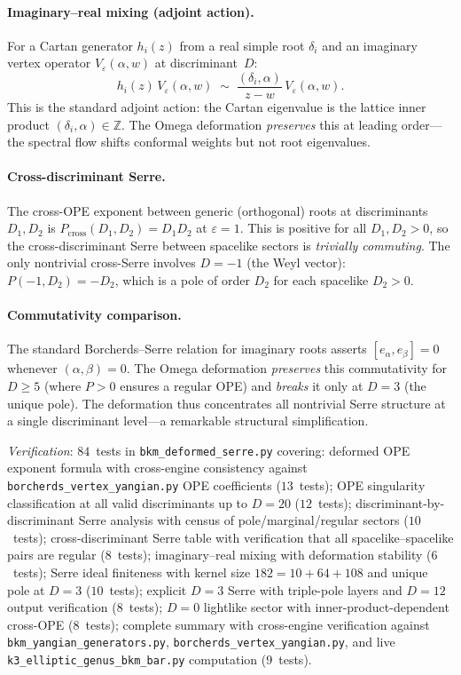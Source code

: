 \paragraph{Imaginary--real mixing (adjoint action).}
For a Cartan generator $h_i(z)$ from a real simple root $\delta_i$ and an imaginary
vertex operator $V_\varepsilon(\alpha, w)$ at discriminant~$D$:
\[
h_i(z)\, V_\varepsilon(\alpha, w)
\;\sim\; \frac{(\delta_i, \alpha)}{z - w}\, V_\varepsilon(\alpha, w).
\]
This is the standard adjoint action: the Cartan eigenvalue is the lattice inner product
$(\delta_i, \alpha) \in \mathbb{Z}$.  The Omega deformation \emph{preserves} this at
leading order---the spectral flow shifts conformal weights but not root eigenvalues.

\paragraph{Cross-discriminant Serre.}
The cross-OPE exponent between generic (orthogonal) roots at discriminants $D_1, D_2$
is $P_{\mathrm{cross}}(D_1, D_2) = D_1 D_2$ at $\varepsilon = 1$.  This is positive
for all $D_1, D_2 > 0$, so the cross-discriminant Serre between spacelike sectors is
\emph{trivially commuting}.  The only nontrivial cross-Serre involves $D = -1$
(the Weyl vector): $P(-1, D_2) = -D_2$, which is a pole of order $D_2$ for each
spacelike $D_2 > 0$.

\paragraph{Commutativity comparison.}
The standard Borcherds--Serre relation for imaginary roots asserts
$[e_\alpha, e_\beta] = 0$ whenever $(\alpha, \beta) = 0$.  The Omega deformation
\emph{preserves} this commutativity for $D \geq 5$ (where $P > 0$ ensures a regular
OPE) and \emph{breaks} it only at $D = 3$ (the unique pole).  The deformation thus
concentrates all nontrivial Serre structure at a single discriminant level---a
remarkable structural simplification.

\noindent\textit{Verification}: $84$~tests in \texttt{bkm\_deformed\_serre.py}
covering: deformed OPE exponent formula with cross-engine consistency against
\texttt{borcherds\_vertex\_yangian.py} OPE coefficients ($13$~tests); OPE singularity
classification at all valid discriminants up to $D = 20$ ($12$~tests); discriminant-by-discriminant
Serre analysis with census of pole/marginal/regular sectors ($10$~tests); cross-discriminant
Serre table with verification that all spacelike--spacelike pairs are regular ($8$~tests);
imaginary--real mixing with deformation stability ($6$~tests); Serre ideal finiteness
with kernel size $182 = 10 + 64 + 108$ and unique pole at $D = 3$ ($10$~tests);
explicit $D = 3$ Serre with triple-pole layers and $D = 12$ output verification
($8$~tests); $D = 0$ lightlike sector with inner-product-dependent cross-OPE ($8$~tests);
complete summary with cross-engine verification against \texttt{bkm\_yangian\_generators.py},
\texttt{borcherds\_vertex\_yangian.py}, and live \texttt{k3\_elliptic\_genus\_bkm\_bar.py}
computation ($9$~tests).


